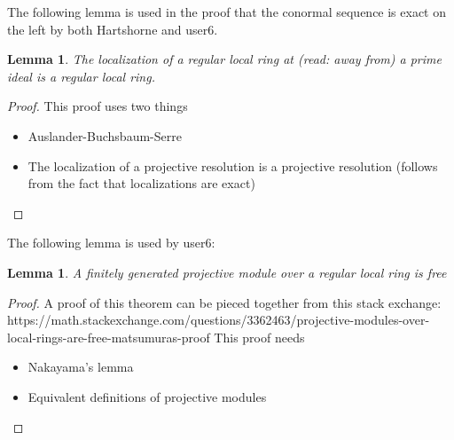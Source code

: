 \documentclass[a4paper]{article}
\newtheorem{lem}[thm]{Lemma}
\begin{document}
The following lemma is used in the proof that the 
conormal sequence is exact on the left by both 
Hartshorne and user6.

\begin{lem}
	The localization of a regular local ring at (read: away from) a prime 
	ideal is a regular local ring.
\end{lem}

\begin{proof}
	This proof uses two things
	\begin{itemize}
		\item Auslander-Buchsbaum-Serre
		\item The localization of a projective resolution
			is a projective resolution
			(follows from the fact that localizations are exact)
	\end{itemize}
\end{proof}

The following lemma is used by user6:

\begin{lem}
	A finitely generated projective module 
	over a regular local ring is free
\end{lem}


\begin{proof}
	A proof of this theorem can be pieced together from this
	stack exchange:
	https://math.stackexchange.com/questions/3362463/projective-modules-over-local-rings-are-free-matsumuras-proof
	This proof needs
	\begin{itemize}
		\item Nakayama's lemma
		\item Equivalent definitions of projective modules
	\end{itemize}
\end{proof}



\end{document}
